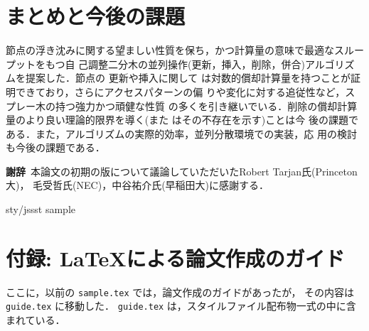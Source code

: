 \documentclass[T]{compsoft}
\begin{document}
\section{まとめと今後の課題}

節点の浮き沈みに関する望ましい性質を保ち，かつ計算量の意味で最適なスルー
プットをもつ自
己調整二分木の並列操作(更新，挿入，削除，併合)アルゴリズムを提案した．節点の
更新や挿入に関して
は対数的償却計算量を持つことが証明できており，さらにアクセスパターンの偏
りや変化に対する追従性など，スプレー木の持つ強力かつ頑健な性質
の多くを引き継いでいる．削除の償却計算量のより良い理論的限界を導く(また
はその不存在を示す)ことは今
後の課題である．また，アルゴリズムの実際的効率，並列分散環境での実装，応
用の検討も今後の課題である．


{\bf 謝辞}\
本論文の初期の版について議論していただいたRobert Tarjan氏(Princeton大)，
毛受哲氏(NEC)，中谷祐介氏(早稲田大)に感謝する．

 {sty/jssst}
 {sample}

\appendix
\section{付録: \LaTeX による論文作成のガイド} 

ここに，以前の \verb|sample.tex| では，論文作成のガイドがあったが，
その内容は \verb|guide.tex| に移動した．
\verb|guide.tex| は，スタイルファイル配布物一式の中に含まれている．
\end{document}
